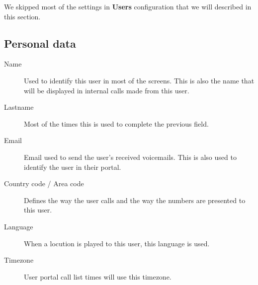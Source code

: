 \documentclass[letterpaper,10pt,english]{sphinxmanual}
\begin{document}
We skipped most of the settings in \textbf{Users} configuration that we will described
in this section.


\subsection{Personal data}
\label{company/users:personal-data}
\noindent{}
\begin{description}
\item[{Name}] \leavevmode{}\label{company/users:term-name}
Used to identify this user in most of the screens. This is also the
name that will be displayed in internal calls made from this user.

\item[{Lastname}] \leavevmode{}\label{company/users:term-lastname}
Most of the times this is used to complete the previous field.

\item[{Email}] \leavevmode{}\label{company/users:term-email}
Email used to send the user's received voicemails. This is also used to
identify the user in their portal.

\item[{Country code / Area code}] \leavevmode{}\label{company/users:term-country-code-area-code}
Defines the way the user calls and the way the numbers are presented to
this user.

\item[{Language}] \leavevmode{}\label{company/users:term-language}
When a locution is played to this user, this language is used.

\item[{Timezone}] \leavevmode{}\label{company/users:term-timezone}
User portal call list times will use this timezone.

\end{description}
\end{document}
